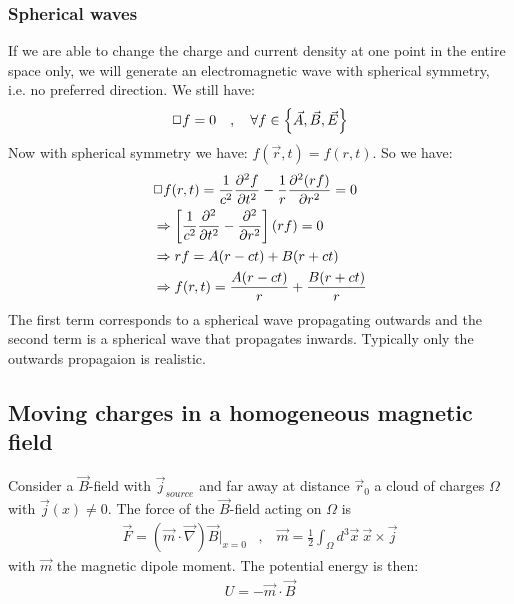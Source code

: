 \subsubsection{Spherical waves}

If we are able to change the charge and current density at one point in
the entire space only, we will generate an electromagnetic wave with
spherical symmetry, i.e. no preferred direction. We still have:
\begin{align*}
    \Box f = 0
    \hspace{10pt} , \hspace{10pt}
    \forall f \in \left\{ \vec{A},\vec{B},\vec{E} \right\}
\end{align*}
Now with spherical symmetry we have: $f(\vec{r},t) = f(r,t)$. So we have:
\begin{align*}
    &\Box f(r,t) =
    \frac{1}{c^2} \frac{\partial^2 f}{\partial t^2} - \frac{1}{r} \frac{\partial^2 (r f)}{\partial r^2}
    = 0
    \\
    &\Rightarrow
    \left[ \frac{1}{c^2} \frac{\partial^2}{\partial t^2} - \frac{\partial^2}{\partial r^2} \right] (r f) = 0
    \\
    &\Rightarrow
    r f = A(r - c t) + B(r + c t)
    \\
    &\Rightarrow
    f(r,t) = \frac{A(r - c t)}{r} + \frac{B(r + c t)}{r}
\end{align*}
The first term corresponds to a spherical wave propagating outwards and
the second term is a spherical wave that propagates inwards. Typically
only the outwards propagaion is realistic.

\subsection{Moving charges in a homogeneous magnetic field}

Consider a $\vec{B}$-field with $\vec{j}_{source}$ and far away at distance
$\vec{r}_0$ a cloud of charges $\Omega$ with $\vec{j} (x) \neq 0$. The
force of the $\vec{B}$-field acting on $\Omega$ is
\begin{align*}
    \vec{F} = (\vec{m} \cdot \vec{\nabla}) \vec{B} \big|_{x=0}
    \hspace{10pt} , \hspace{10pt}
    \vec{m} = \frac{1}{2} \int_\Omega d^3 \vec{x} \ \vec{x} \times \vec{j}
\end{align*}
with $\vec{m}$ the magnetic dipole moment. The potential energy is then:
\begin{align*}
    U = - \vec{m} \cdot \vec{B}
\end{align*}
